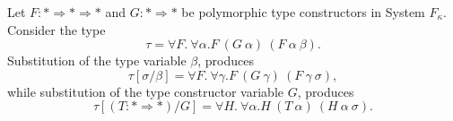 \documentclass[../../Dissertation.tex]{subfiles}
\begin{document}
\begin{example}
  Let $F : * \Rightarrow * \Rightarrow *$ and $G : * \Rightarrow *$ be polymorphic type constructors in System $F_\kappa$. Consider the type
  \begin{equation*}
    \tau = \forall F.\ \forall \alpha.F\ (G\ \alpha)\ (F\ \alpha\ \beta).
  \end{equation*}
  Substitution of the type variable $\beta$, produces
  \begin{equation*}
    \tau[\sigma/\beta] = \forall F.\ \forall \gamma.F\ (G\ \gamma)\ (F\ \gamma\ \sigma),
  \end{equation*}
  while substitution of the type constructor variable $G$, produces
  \begin{equation*}
    \tau[(T : * \Rightarrow *)/G] = \forall H.\ \forall \alpha.H\ (T\ \alpha)\ (H\ \alpha\ \sigma).
  \end{equation*}
\end{example}
\end{document}
